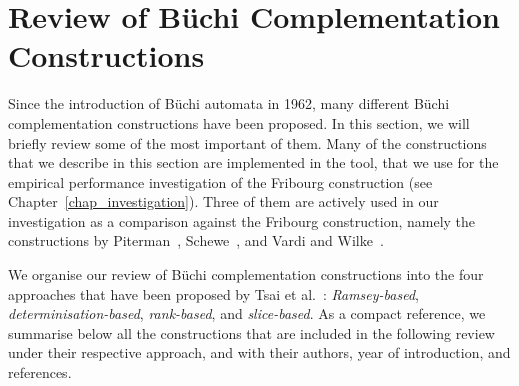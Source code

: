 \section{Review of Büchi Complementation Constructions}
\label{2_review}
Since the introduction of Büchi automata in 1962, many different Büchi complementation constructions have been proposed. In this section, we will briefly review some of the most important of them. Many of the constructions that we describe in this section are implemented in the \goal tool, that we use for the empirical performance investigation of the Fribourg construction (see Chapter~\ref{chap_investigation}). Three of them are actively used in our investigation as a comparison against the Fribourg construction, namely the constructions by Piterman~\cite{2006_piterman,2007_piterman}, Schewe~\cite{schewe2009buchi}, and Vardi and Wilke~\cite{vardi2007automata}.

We organise our review of Büchi complementation constructions into the four  approaches that have been proposed by Tsai et al.~\cite{2011_tsai}: \textit{Ramsey-based}, \textit{determinisation-based}, \textit{rank-based}, and \textit{slice-based}. As a compact reference, we summarise below all the constructions that are included in the following review under their respective approach, and with their authors, year of introduction, and references.


